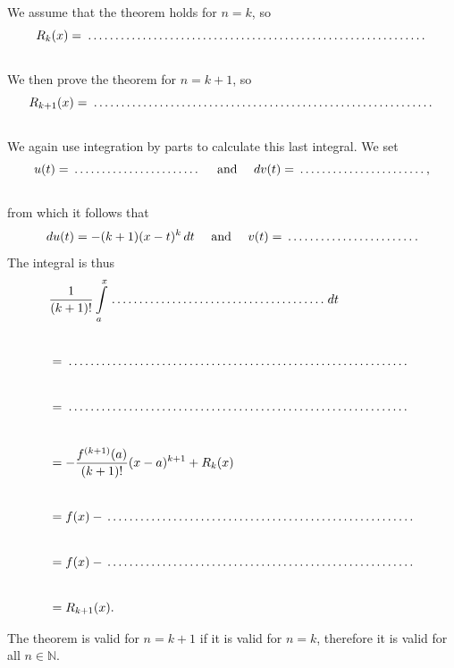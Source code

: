 \begin{Exercise}
We assume that the theorem holds for $n=k$, so
\\[0.5cm]
\[R_k(x) = \dotrule{0.80\textwidth} %
\]
\\[0.5cm]
We then prove the theorem for $n=k+1$, so
\\[0.5cm]
\[R_{k+1}(x) = \dotrule{0.80\textwidth} %
\]
\\[0.5cm]
We again use integration by parts to calculate this last integral. We set
\\[0.2cm]
\[ u(t) = \dotrule{0.30\textwidth} \quad \text{ and } \quad dv(t) = \dotrule{0.30\textwidth},\]
\\[0.2cm]
from which it follows that
\[ du(t) = -(k+1)(x-t)^k \,dt \quad \text{ and } \quad v(t) = \dotrule{0.30\textwidth}.\]
The integral is thus
\begin{align*}
	& \dfrac{1}{(k+1)!} \int\limits_{a}^{x} \dotrule{0.50\textwidth} \, dt \\[0.75cm]	
	&= \dotrule{0.80\textwidth} \\[0.75cm]
	&= \dotrule{0.80\textwidth} \\[0.75cm]
	&= - \dfrac{f^{(k+1)}(a)}{(k+1)!}(x-a)^{k+1} + R_k(x) \\[0.75cm]
	&= f(x) - \dotrule{0.72\textwidth} \\[0.75cm]
	&= f(x) - \dotrule{0.72\textwidth} \\[0.75cm]
	&= R_{k+1}(x). \\	
\end{align*}

The theorem is valid for $n=k+1$ if it is valid for $n=k$, therefore it is valid for all $n \in \mathbb{N}$.
\end{Exercise}


